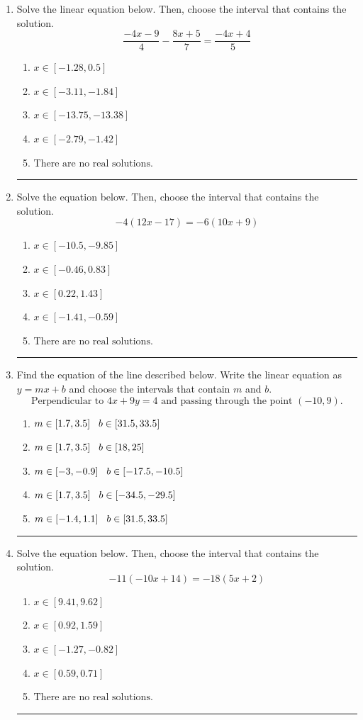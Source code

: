 \documentclass[14pt]{extbook}
\newcommand{\litem}[1]{\item#1\hspace*{-1cm}\rule{\textwidth}{0.4pt}}
\begin{document}
\begin{enumerate}
{\begin{enumerate}[label=\Alph*.]
\end{enumerate} }
\litem{
Solve the linear equation below. Then, choose the interval that contains the solution.\[ \frac{-4x -9}{4} - \frac{8x + 5}{7} = \frac{-4x + 4}{5} \]\begin{enumerate}[label=\Alph*.]
\item \( x \in [-1.28, 0.5] \)
\item \( x \in [-3.11, -1.84] \)
\item \( x \in [-13.75, -13.38] \)
\item \( x \in [-2.79, -1.42] \)
\item \( \text{There are no real solutions.} \)

\end{enumerate} }
\litem{
Solve the equation below. Then, choose the interval that contains the solution.\[ -4(12x -17) = -6(10x + 9) \]\begin{enumerate}[label=\Alph*.]
\item \( x \in [-10.5, -9.85] \)
\item \( x \in [-0.46, 0.83] \)
\item \( x \in [0.22, 1.43] \)
\item \( x \in [-1.41, -0.59] \)
\item \( \text{There are no real solutions.} \)

\end{enumerate} }
\litem{
Find the equation of the line described below. Write the linear equation as $ y=mx+b $ and choose the intervals that contain $m$ and $b$.\[ \text{Perpendicular to } 4 x + 9 y = 4 \text{ and passing through the point } (-10, 9). \]\begin{enumerate}[label=\Alph*.]
\item \( m \in [1.7, 3.5] \hspace*{3mm} b \in [31.5, 33.5] \)
\item \( m \in [1.7, 3.5] \hspace*{3mm} b \in [18, 25] \)
\item \( m \in [-3, -0.9] \hspace*{3mm} b \in [-17.5, -10.5] \)
\item \( m \in [1.7, 3.5] \hspace*{3mm} b \in [-34.5, -29.5] \)
\item \( m \in [-1.4, 1.1] \hspace*{3mm} b \in [31.5, 33.5] \)

\end{enumerate} }
\litem{
Solve the equation below. Then, choose the interval that contains the solution.\[ -11(-10x + 14) = -18(5x + 2) \]\begin{enumerate}[label=\Alph*.]
\item \( x \in [9.41, 9.62] \)
\item \( x \in [0.92, 1.59] \)
\item \( x \in [-1.27, -0.82] \)
\item \( x \in [0.59, 0.71] \)
\item \( \text{There are no real solutions.} \)


\end{enumerate}}
\end{enumerate}
\end{document}

